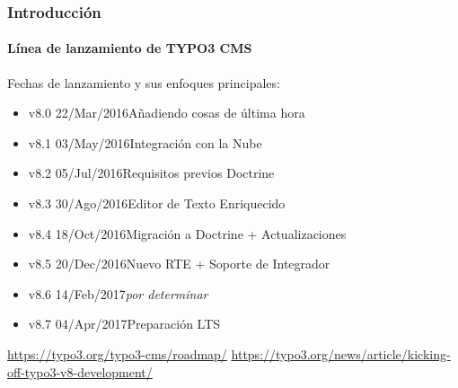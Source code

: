\begin{frame}[fragile]
	\frametitle{Introducción}
	\framesubtitle{Línea de lanzamiento de TYPO3 CMS}

	Fechas de lanzamiento y sus enfoques principales:

	\begin{itemize}

		\item v8.0 \tabto{1.1cm}22/Mar/2016\tabto{3.4cm}Añadiendo cosas de última hora
		\item v8.1 \tabto{1.1cm}03/May/2016\tabto{3.4cm}Integración con la Nube
		\item v8.2 \tabto{1.1cm}05/Jul/2016\tabto{3.4cm}Requisitos previos Doctrine
		\item v8.3 \tabto{1.1cm}30/Ago/2016\tabto{3.4cm}Editor de Texto Enriquecido
		\item
			\begingroup
				\color{typo3orange}
					v8.4 \tabto{1.1cm}18/Oct/2016\tabto{3.4cm}Migración a Doctrine + Actualizaciones
			\endgroup
		\item v8.5 \tabto{1.1cm}20/Dec/2016\tabto{3.4cm}Nuevo RTE + Soporte de Integrador
		\item v8.6 \tabto{1.1cm}14/Feb/2017\tabto{3.4cm}\textit{por determinar}
		\item v8.7 \tabto{1.1cm}04/Apr/2017\tabto{3.4cm}Preparación LTS

	\end{itemize}

	\smaller
		\url{https://typo3.org/typo3-cms/roadmap/}\newline
		\url{https://typo3.org/news/article/kicking-off-typo3-v8-development/}
	\normalsize

\end{frame}

